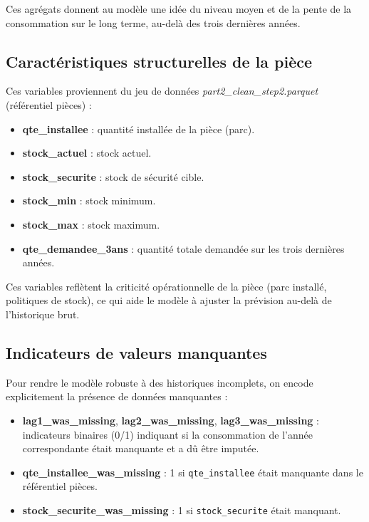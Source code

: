 \documentclass[11pt,a4paper]{article}
\begin{document}
Ces agrégats donnent au modèle une idée du niveau moyen et de la pente de la consommation sur le long terme, au-delà des trois dernières années.

\subsection{Caractéristiques structurelles de la pièce}

Ces variables proviennent du jeu de données \emph{part2\_clean\_step2.parquet} (référentiel pièces) :

\begin{itemize}
  \item \textbf{qte\_installee} : quantité installée de la pièce (parc).
  \item \textbf{stock\_actuel} : stock actuel.
  \item \textbf{stock\_securite} : stock de sécurité cible.
  \item \textbf{stock\_min} : stock minimum.
  \item \textbf{stock\_max} : stock maximum.
  \item \textbf{qte\_demandee\_3ans} : quantité totale demandée sur les trois dernières années.
\end{itemize}

Ces variables reflètent la criticité opérationnelle de la pièce (parc installé, politiques de stock), ce qui aide le modèle à ajuster la prévision au-delà de l'historique brut.

\subsection{Indicateurs de valeurs manquantes}

Pour rendre le modèle robuste à des historiques incomplets, on encode explicitement la présence de données manquantes :

\begin{itemize}
  \item \textbf{lag1\_was\_missing}, \textbf{lag2\_was\_missing}, \textbf{lag3\_was\_missing} : indicateurs binaires (0/1) indiquant si la consommation de l'année correspondante était manquante et a dû être imputée.
  \item \textbf{qte\_installee\_was\_missing} : 1 si \texttt{qte\_installee} était manquante dans le référentiel pièces.
  \item \textbf{stock\_securite\_was\_missing} : 1 si \texttt{stock\_securite} était manquant.
\end{itemize}
\end{document}
